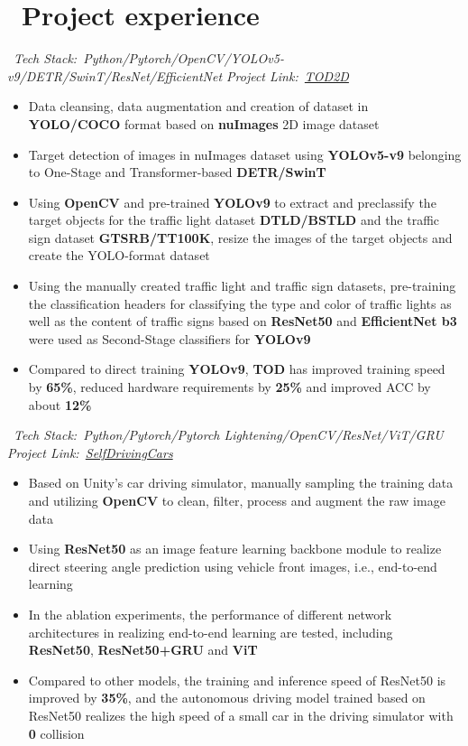 \documentclass{resume}
\begin{document}
\section{\faFolder\ Project experience}
\ \textit{Tech Stack:\ Python/Pytorch/OpenCV/YOLOv5-v9/DETR/SwinT/ResNet/EfficientNet \hfill Project Link:\ \href{https://github.com/LuckyMax0722/TOD2D}{TOD2D}}
\begin{itemize}
  \item Data cleansing, data augmentation and creation of dataset in \textbf{YOLO/COCO} format based on \textbf{nuImages} 2D image dataset
  \item Target detection of images in nuImages dataset using \textbf{YOLOv5-v9} belonging to One-Stage and Transformer-based \textbf{DETR/SwinT}
  \item Using \textbf{OpenCV} and pre-trained \textbf{YOLOv9} to extract and preclassify the target objects for the traffic light dataset \textbf{DTLD/BSTLD} and the traffic sign dataset \textbf{GTSRB/TT100K}, resize the images of the target objects and create the YOLO-format dataset
  \item Using the manually created traffic light and traffic sign datasets, pre-training the classification headers for classifying  the type and color of traffic lights as well as the content of traffic signs based on \textbf{ResNet50} and \textbf{EfficientNet b3} were used as Second-Stage classifiers for \textbf{YOLOv9}
  \item Compared to direct training \textbf{YOLOv9}, \textbf{TOD} has improved training speed by \textbf{65\%}, reduced hardware requirements by \textbf{25\%} and improved ACC by about \textbf{12\%}
\end{itemize}

\ \textit{Tech Stack:\ Python/Pytorch/Pytorch Lightening/OpenCV/ResNet/ViT/GRU \hfill Project Link:\ \href{https://github.com/LuckyMax0722/SelfDrivingCars}{SelfDrivingCars}}
\begin{itemize}
  \item Based on Unity's car driving simulator, manually sampling the training data and utilizing \textbf {OpenCV} to clean, filter, process and augment the raw image data
  \item Using \textbf{ResNet50} as an image feature learning backbone module to realize direct steering angle prediction using vehicle front images, i.e., end-to-end learning
  \item In the ablation experiments, the performance of different network architectures in realizing end-to-end learning are tested, including \textbf{ResNet50}, \textbf{ResNet50+GRU} and \textbf{ViT}
  \item Compared to other models, the training and inference speed of ResNet50 is improved by \textbf{35\%}, and the autonomous driving model trained based on ResNet50 realizes the high speed of a small car in the driving simulator with \textbf{0} collision
\end{itemize}
\end{document}
